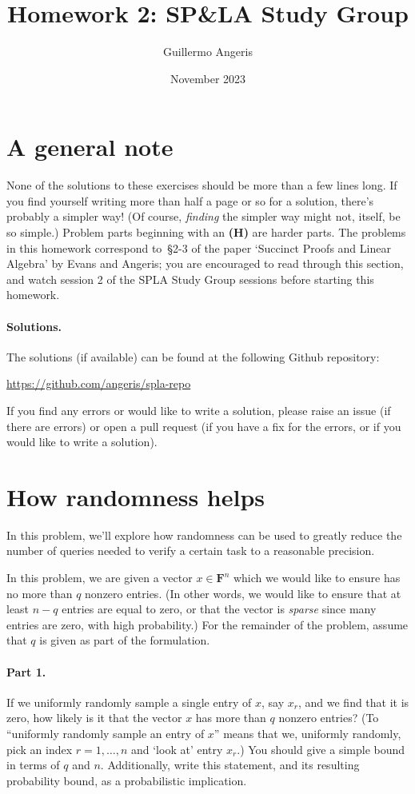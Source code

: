 \documentclass[12pt]{article}
\title{Homework 2: SP\&LA Study Group}
\author{Guillermo Angeris}
\date{November 2023}
\newcommand{\field}{\mathbf{F}}
\begin{document}
 
\maketitle 

\section*{A general note}
None of the solutions to these exercises should be more than a few lines long.
If you find yourself writing more than half a page or so for a solution,
there's probably a simpler way! (Of course, \emph{finding} the simpler way
might not, itself, be so simple.) Problem parts beginning with an {\bf (H)} are
harder parts. The problems in this homework correspond to~\S2-3 of the paper
`Succinct Proofs and Linear Algebra' by Evans and Angeris; you are encouraged
to read through this section, and watch session 2 of the SPLA Study Group
sessions before starting this homework.

\paragraph{Solutions.} The solutions (if available) can be found at the
following Github repository:
\begin{center}
    \url{https://github.com/angeris/spla-repo}
\end{center}
If you find any errors or would like to write a solution, please raise an issue
(if there are errors) or open a pull request (if you have a fix for the errors,
or if you would like to write a solution).

\section{How randomness helps}
In this problem, we'll explore how randomness can be used to greatly reduce
the number of queries needed to verify a certain task to a reasonable
precision.

In this problem, we are given a vector $x \in \field^n$ which we would like to
ensure has no more than $q$ nonzero entries. (In other words, we would like to
ensure that at least $n-q$ entries are equal to zero, or that the vector is
\emph{sparse} since many entries are zero, with high probability.) For the
remainder of the problem, assume that $q$ is given as part of the formulation.

\paragraph{Part 1.} If we uniformly randomly sample a single entry of $x$, say
$x_r$, and we find that it is zero, how likely is it that the vector $x$ has
more than $q$ nonzero entries? (To ``uniformly randomly sample an entry of
$x$'' means that we, uniformly randomly, pick an index $r=1, \dots, n$ and
`look at' entry $x_r$.) You should give a simple bound in terms of $q$ and $n$.
Additionally, write this statement, and its resulting probability bound, as a
probabilistic implication.
\end{document}
